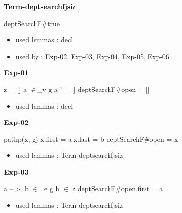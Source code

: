 \documentclass[a4paper]{article}
\begin{document}
\raggedright
              
\bigskip

{\large\bf Term-deptsearchfjsiz}

\medskip

 \Fol \Do deptSearchF\#\Dc true

\begin{itemize}


\item       used lemmas  : decl
\item       used by      : Exp-02, Exp-03, Exp-04, Exp-05, Exp-06

\end{itemize}

\medskip

\bigskip

{\large\bf Exp-01}

\medskip

 \Fol z = [] \And a $\in$\_v g \Or a ' = [] \Imp \Do deptSearchF\#\Dc open = []

\begin{itemize}


\item       used lemmas  : decl

\end{itemize}

\medskip

\bigskip

{\large\bf Exp-02}

\medskip

 \Fol pathp(x, g) \And x.first = a \And x.last = b \Imp \Do deptSearchF\#\Dc open = x

\begin{itemize}


\item       used lemmas  : Term-deptsearchfjsiz

\end{itemize}

\medskip

\bigskip

{\large\bf Exp-03}

\medskip

 \Fol a --$>$ b $\in$\_e g \And b $\in$ z \Imp \Do deptSearchF\#\Dc open.first = a

\begin{itemize}


\item       used lemmas  : Term-deptsearchfjsiz

\end{itemize}
\end{document}
